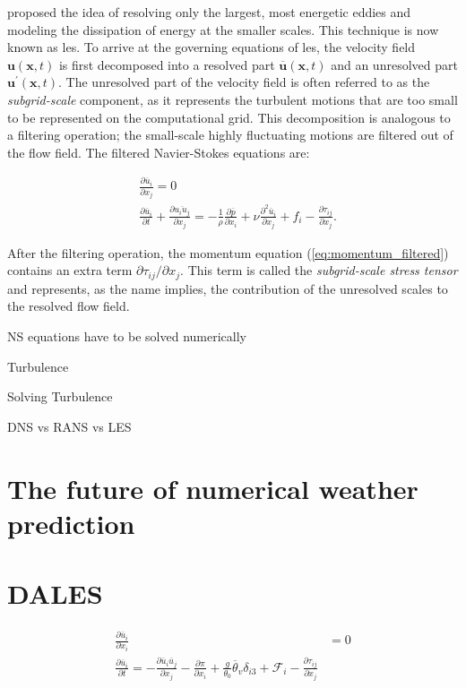 \citet{smagorinskyGeneralCirculationExperiments1963} proposed the idea of resolving only the largest, most energetic eddies and modeling the dissipation of energy at the smaller scales. This technique is now known as \acrfull{les}. To arrive at the governing equations of \acrshort{les}, the velocity field $\mathbf{u}(\mathbf{x},t)$ is first decomposed into a resolved part $\overline{\mathbf{u}}(\mathbf{x},t)$ and an unresolved part $\mathbf{u}^\prime(\mathbf{x},t)$. The unresolved part of the velocity field is often referred to as the \emph{subgrid-scale} component, as it represents the turbulent motions that are too small to be represented on the computational grid. This decomposition is analogous to a filtering operation; the small-scale highly fluctuating motions are filtered out of the flow field. The filtered Navier-Stokes equations are:

\begin{align}
    &\frac{\partial \overline{u}_i}{\partial x_j} = 0 \label{eq:continuity_filtered}\\ 
    &\frac{\partial \overline{u}_i}{\partial t} + \frac{\partial \overline{u_i u_j}}{\partial x_j} = - \frac{1}{\rho} \frac{\partial \overline{p}}{\partial x_i} + \nu \frac{\partial^2 \overline{u}_i}{\partial x_j} + f_i - \frac{\partial \tau_{ij}}{\partial x_j}.  \label{eq:momentum_filtered}
\end{align}

After the filtering operation, the momentum equation (\autoref{eq:momentum_filtered}) contains an extra term $\partial \tau_{ij} / \partial x_j$. This term is called the \emph{subgrid-scale stress tensor} and represents, as the name implies, the contribution of the unresolved scales to the resolved flow field. 


NS equations have to be solved numerically

Turbulence 

Solving Turbulence

DNS vs RANS vs LES

\section{The future of numerical weather prediction}

\section{DALES}

\begin{align}
    \frac{\partial \overline{u}_i}{\partial x_i} &= 0 \label{eq:mass_conservation} \\
    \frac{\partial \overline{u}_i}{\partial t} = - \frac{\partial \overline{u}_i \overline{u}_j}{\partial x_j} - \frac{\partial \pi}{\partial x_i} + \frac{g}{\theta_0}\overline{\theta}_v \delta_{i3} + \mathcal{F}_i - \frac{\partial \tau_{ij}}{\partial x_j} \label{eq:momentum}
\end{align}



